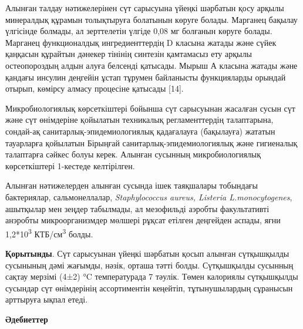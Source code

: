 \begin{multicols}{2}
Алынған талдау нәтижелерінен сүт сарысуына үйеңкі шәрбатын қосу арқылы
минералдық құрамын толықтыруға болатынын көруге болады. Марганец бақылау
үлгісінде болмады, ал зерттелетін үлгіде 0,08 мг болғанын көруге болады.
Марганец функционалдық ингредиенттердің D класына жатады және сүйек
қаңқасын құрайтын дәнекер тінінің синтезін қамтамасыз ету арқылы
остеопороздың алдын алуға белсенді қатысады. Мырыш А класына жатады және
қандағы инсулин деңгейін ұстап тұрумен байланысты функцияларды орындай
отырып, көмірсу алмасу процесіне қатысады {[}14{]}.

Микробиологиялық көрсеткіштері бойынша сүт сарысуынан жасалған сусын сүт
және сүт өнімдеріне қойылатын техникалық регламенттердің талаптарына,
сондай-ақ санитарлық-эпидемиологиялық қадағалауға (бақылауға) жататын
тауарларға қойылатын Бірыңғай санитарлық-эпидемиологиялық және
гигиеналық талаптарға сәйкес болуы керек. Алынған сусынның
микробиологиялық көрсеткіштері 1-кестеде келтірілген.

Алынған нәтижелерден алынған сусында ішек таяқшалары тобындағы
бактериялар, сальмонеллалар, \emph{Staphylococcus aureus, Listeria
L.monocytogenes}, ашытқылар мен зеңдер табылмады, ал мезофильді аэробты
факультативті анэробты микроорганизмдер мөлшері рұқсат етілген деңгейден
аспады, яғни 1,2*10\textsuperscript{3} КТБ/см\textsuperscript{3} болды.

{\bfseries Қорытынды}. Сүт сарысуынан үйеңкі шәрбатын қосып алынған
сүтқышқылды сусынының дәмі жағымды, нәзік, орташа тәтті болды.
Сүтқышқылды сусынның сақтау мерзімі (4±2) °C температурада 7 тәулік.
Төмен калориялы сүтқышқылды сусындар сүт өнімдерінің ассортиментін
кеңейтіп, тұтынушылардың сұранысын арттыруға ықпал етеді.
\end{multicols}

\begin{center}
{\bfseries Әдебиеттер}
\end{center}


